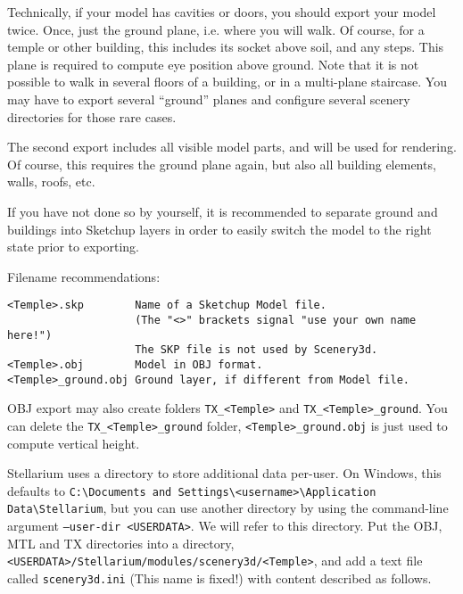 \documentclass[a4paper]{article}
\newcommand{\cmd}[1]{\texttt{#1}}
\begin{document}
Technically, if your model has cavities or doors, you should export
your model twice. Once, just the ground plane, i.e. where you will
walk. Of course, for a temple or other building, this includes its
socket above soil, and any steps.  This plane is required to compute
eye position above ground. Note that it is not possible to walk in
several floors of a building, or in a multi-plane staircase. You may
have to export several ``ground'' planes and configure several scenery
directories for those rare cases.

The second export includes all visible model parts, and will be used for
rendering. Of course, this requires the ground plane again, but also
all building elements, walls, roofs, etc. 

If you have not done so by yourself, it is recommended to separate
ground and buildings into Sketchup layers in order to easily switch
the model to the right state prior to exporting.

Filename recommendations: 
\begin{verbatim}
<Temple>.skp        Name of a Sketchup Model file. 
                    (The "<>" brackets signal "use your own name here!")
                    The SKP file is not used by Scenery3d.
<Temple>.obj        Model in OBJ format. 
<Temple>_ground.obj Ground layer, if different from Model file. 
\end{verbatim}

OBJ export may also create folders \verb|TX_<Temple>| and
\verb|TX_<Temple>_ground|. You can delete the \verb|TX_<Temple>_ground| folder, 
\verb|<Temple>_ground.obj| is just used to compute vertical height.

Stellarium uses a directory to store additional data per-user. On Windows, this defaults to 
\verb|C:\Documents and Settings\<username>\Application Data\Stellarium|, but you can use another directory by using the command-line argument 
\cmd{--user-dir <USERDATA>}. We will refer to this directory.
Put the OBJ, MTL and TX directories into a directory, \\
\verb|<USERDATA>/Stellarium/modules/scenery3d/<Temple>|, and add a text file
called \texttt{scenery3d.ini} (This name is fixed!) with content described as follows.

%
\end{document}
